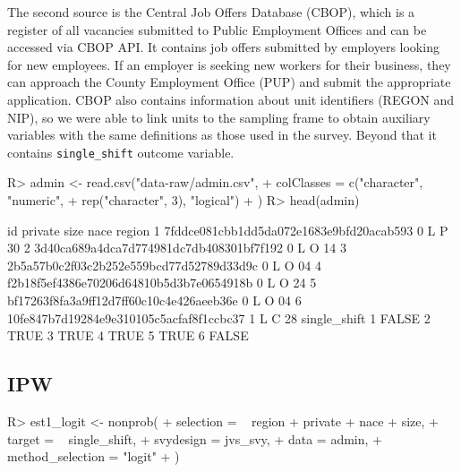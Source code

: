 \documentclass[
]{jss}
\begin{document}
The second source is the Central Job Offers Database (CBOP), which is a
register of all vacancies submitted to Public Employment Offices and can
be accessed via CBOP API. It contains job offers submitted by employers
looking for new employees. If an employer is seeking new workers for
their business, they can approach the County Employment Office (PUP) and
submit the appropriate application. CBOP also contains information about
unit identifiers (REGON and NIP), so we were able to link units to the
sampling frame to obtain auxiliary variables with the same definitions
as those used in the survey. Beyond that it contains
\texttt{single\_shift} outcome variable.

\begin{CodeChunk}
\begin{CodeInput}
R> admin <- read.csv("data-raw/admin.csv",
+                  colClasses = c("character", "numeric",
+                                 rep("character", 3), "logical")
+                  )
R> head(admin)
\end{CodeInput}
\begin{CodeOutput}
                                        id private size nace region
1 7fddce081cbb1dd5da072e1683e9bfd20acab593       0    L    P     30
2 3d40ca689a4dca7d774981dc7db408301bf7f192       0    L    O     14
3 2b5a57b0c2f03c2b252e559bcd77d52789d33d9c       0    L    O     04
4 f2b18f5ef4386e70206d64810b5d3b7e0654918b       0    L    O     24
5 bf17263f8fa3a9ff12d7ff60c10c4e426aeeb36e       0    L    O     04
6 10fe847b7d19284e9e310105c5acfaf8f1ccbc37       1    L    C     28
  single_shift
1        FALSE
2         TRUE
3         TRUE
4         TRUE
5         TRUE
6        FALSE
\end{CodeOutput}
\end{CodeChunk}

\hypertarget{ipw}{%
\subsection{IPW}\label{ipw}}

\begin{CodeChunk}
\begin{CodeInput}
R> est1_logit <- nonprob(
+   selection = ~ region + private + nace + size,
+   target = ~ single_shift,
+   svydesign = jvs_svy,
+   data = admin,
+   method_selection = "logit"
+ )
\end{CodeInput}
\end{CodeChunk}
\end{document}

